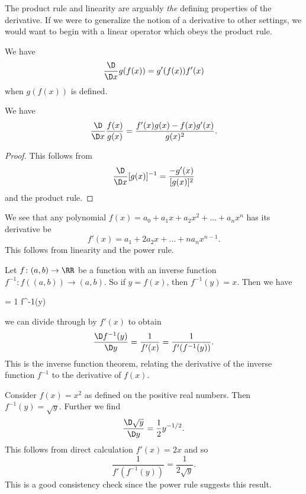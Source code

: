 \begin{node}\label{calculus-000A}%
The product rule and linearity are arguably \emph{the} defining
properties of the derivative. If we were to generalize the notion of a
derivative to other settings, we would want to begin with a linear
operator which obeys the product rule.
\end{node}

\begin{node}\label{calculus-000U}%
We have
\[\frac{\D}{\D x}g(f(x))=g'(f(x))f'(x)\]
when $g(f(x))$ is defined.
\end{node} %

\begin{corollary}\label{calculus-000V}%
We have
\[\frac{\D}{\D x}\frac{f(x)}{g(x)}=\frac{f'(x)g(x)-f(x)g'(x)}{g(x)^{2}}.\]
\end{corollary} %

\begin{proof}
This follows from 
\begin{equation*}
\frac{\D}{\D x}[g(x)]^{-1}=\frac{-g'(x)}{[g(x)]^{2}}
\end{equation*}
and the product rule.
\end{proof}

\begin{example}\label{calculus-000C}%
We see that any polynomial
$f(x)=a_{0}+a_{1}x+a_{2}x^{2}+\dots+a_{n}x^{n}$ has its derivative be
\begin{equation*}
f'(x) = a_{1} + 2a_{2}x+\dots+na_{n}x^{n-1}.
\end{equation*}
This follows from linearity and the power rule.
\end{example}

\begin{node}\label{calculus-001A}%
Let $f\colon(a,b)\to\RR$ be a function with an inverse function
$f^{-1}\colon f((a,b))\to(a,b)$. So if $y=f(x)$, then $f^{-1}(y)=x$.
Then we have
\begin{calculation}
   = 1
  f^{-1}(y)
\end{calculation}
we can divide through by $f'(x)$ to obtain
\[\frac{\D f^{-1}(y)}{\D y}=\frac{1}{f'(x)}=\frac{1}{f'(f^{-1}(y))}.\]
This is the inverse function theorem, relating the derivative of the
inverse function $f^{-1}$ to the derivative of $f(x)$.

\begin{example}\label{calculus-001B}%
Consider $f(x)=x^{2}$ as defined on the positive real numbers. Then
$f^{-1}(y)=\sqrt{y}$. Further we find
\[\frac{\D\sqrt{y}}{\D y}=\frac{1}{2}y^{-1/2}.\]
This follows from direct calculation $f'(x)=2x$ and so
\[\frac{1}{f'(f^{-1}(y))}=\frac{1}{2\sqrt{y}}.\]
This is a good consistency check since the power rule suggests
this result.
\end{example}
\end{node} %
